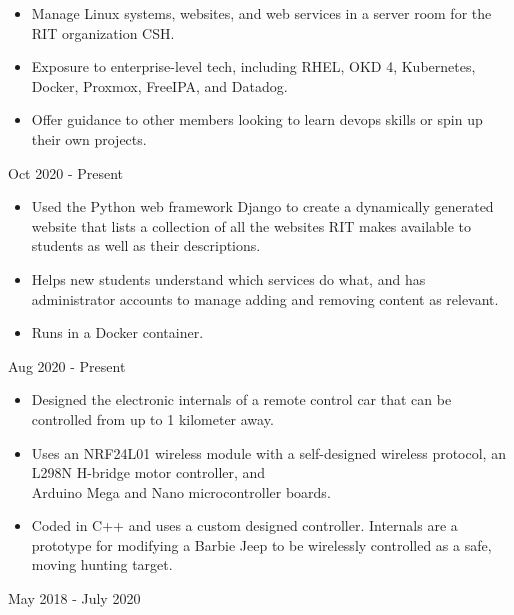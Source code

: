 \documentclass[11pt,letterpaper,ragged2e]{altacv}
\begin{document}

\begin{fullwidth}
\makecvheader
\end{fullwidth}




{
\begin{itemize}
    \item Manage Linux systems, websites, and web services in a server room for the RIT organization CSH.
    \item Exposure to enterprise-level tech, including RHEL, OKD 4, Kubernetes, Docker, Proxmox, FreeIPA, and Datadog.
    \item Offer guidance to other members looking to learn devops skills or spin up their own projects.
\end{itemize}
}
{Oct 2020 - Present} \


{
\begin{itemize}
    \item Used the Python web framework Django to create a dynamically generated website that lists a collection of all the websites RIT makes available to students as well as their descriptions.
    \item Helps new students understand which services do what, and has administrator accounts to manage adding and removing content as relevant.
    \item Runs in a Docker container.
\end{itemize}
}
{Aug 2020 - Present}


{
\begin{itemize}
    \item Designed the electronic internals of a remote control car that can be controlled from up to 1 kilometer away.
    \item Uses an NRF24L01 wireless module with a self-designed wireless protocol, an L298N H-bridge motor controller, and \\ Arduino Mega and Nano microcontroller boards.
    \item Coded in C++ and uses a custom designed controller. Internals are a prototype for modifying a Barbie Jeep to be wirelessly controlled as a safe, moving hunting target.
\end{itemize}
}
{May 2018 - July 2020}
\end{document}
